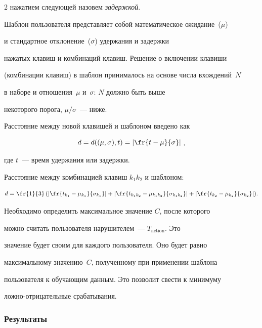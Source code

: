 \begin{multicols}{2}
нажатием следующей назовем \textit{задержкой}.



Шаблон пользователя представляет собой математическое ожидание~($\mu$) 

и стандартное отклонение~($\sigma$) удержания и задержки

нажатых клавиш и комбинаций клавиш. Решение о включении клавиши

(комбинации клавиш) в шаблон принималось на основе числа вхождений~$N$ 

в наборе и отношения~$\mu$ и~$\sigma$: $N$ должно быть выше

некоторого порога, ${\mu}/{\sigma}$~--- ниже.



Расстояние между новой клавишей и шаблоном введено как

$$

d = d((\mu, \sigma), t) = \left|\fr{t - \mu}{\sigma}\right|\,,

$$

где $t$~--- время удержания или задержки.



Расстояние между комбинацией клавиш $k_1k_2$ и шаблоном:

$$

d = \fr{1}{3}  \left( \left|\fr{t_{k_1} - \mu_{k_1}}{\sigma_{k_1}}\right| + 

\left|\fr{t_{k_1 k_2} - \mu_{k_1 k_2}}{\sigma_{k_1 k_2}}\right| + 

\left|\fr{t_{k_2} - \mu_{k_2}}{\sigma_{k_2}}\right| \right)\!.

$$



Необходимо определить максимальное значение $C$, после которого

можно считать пользователя нарушителем~--- $T_{\mathrm{action}}$. Это

значение будет своим для каждого пользователя. Оно будет равно

максимальному значению~$C$, полученному при применении шаблона

пользователя к обучающим данным. Это позволит свести к минимуму

лож\-но-от\-ри\-ца\-тель\-ные срабатывания.



\subsubsection{Результаты}




\end{multicols}

